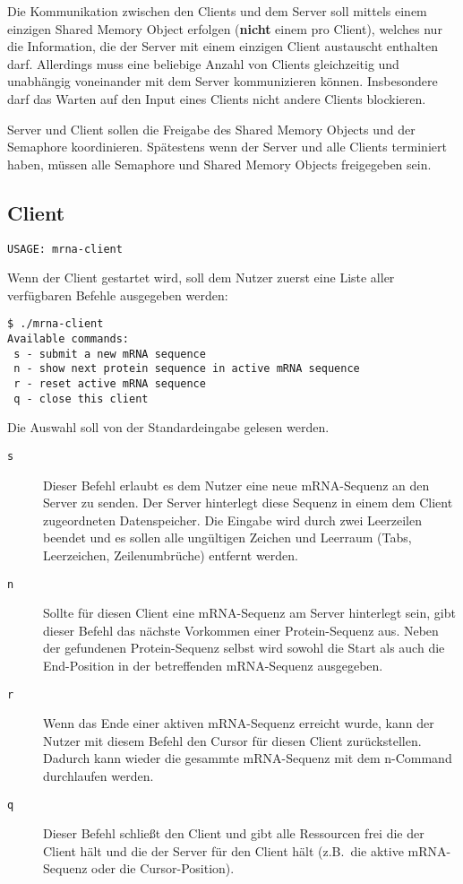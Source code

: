 Die Kommunikation zwischen den Clients und dem Server soll mittels einem
einzigen Shared Memory Object erfolgen (\textbf{nicht} einem pro Client),
welches nur die Information, die der Server mit einem einzigen Client
austauscht enthalten darf.  Allerdings muss eine beliebige Anzahl von Clients
gleichzeitig und unabhängig voneinander mit dem Server kommunizieren können.
Insbesondere darf das Warten auf den Input eines Clients nicht andere Clients
blockieren.

Server und Client sollen die Freigabe des Shared Memory Objects und der
Semaphore koordinieren. Spätestens wenn der Server und alle Clients terminiert
haben, müssen alle Semaphore und Shared Memory Objects freigegeben sein.


\subsection*{Client}

\begin{verbatim}
USAGE: mrna-client
\end{verbatim}

Wenn der Client gestartet wird, soll dem Nutzer zuerst eine Liste aller
verfügbaren Befehle ausgegeben werden:

\begin{verbatim}
$ ./mrna-client
Available commands:
 s - submit a new mRNA sequence
 n - show next protein sequence in active mRNA sequence
 r - reset active mRNA sequence
 q - close this client
\end{verbatim}

Die Auswahl soll von der Standardeingabe gelesen werden.

\begin{description}

  \item[\texttt{s}] Dieser Befehl erlaubt es dem Nutzer eine neue mRNA-Sequenz
    an den Server zu senden. Der Server hinterlegt diese Sequenz in einem dem
    Client zugeordneten Datenspeicher. Die Eingabe wird durch zwei Leerzeilen
    beendet und es sollen alle ungültigen Zeichen und Leerraum (Tabs,
    Leerzeichen, Zeilenumbrüche) entfernt werden.

  \item[\texttt{n}] Sollte für diesen Client eine mRNA-Sequenz am Server
    hinterlegt sein, gibt dieser Befehl das nächste Vorkommen einer
    Protein-Sequenz aus. Neben der gefundenen Protein-Sequenz selbst wird
    sowohl die Start als auch die End-Position in der betreffenden mRNA-Sequenz
    ausgegeben.

  \item[\texttt{r}] Wenn das Ende einer aktiven mRNA-Sequenz erreicht wurde,
    kann der Nutzer mit diesem Befehl den Cursor für diesen Client
    zurückstellen. Dadurch kann wieder die gesammte mRNA-Sequenz mit dem
    n-Command durchlaufen werden.

  \item[\texttt{q}] Dieser Befehl schließt den Client und gibt alle Ressourcen
    frei die der Client hält und die der Server für den Client hält
    (z.B.\ die aktive mRNA-Sequenz oder die Cursor-Position).

\end{description}


